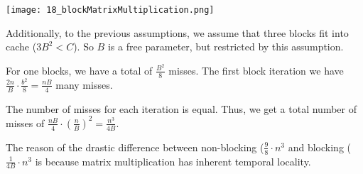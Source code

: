 \texttt{[image: 18\_blockMatrixMultiplication.png]}

Additionally, to the previous assumptions, we assume that three blocks fit into cache ($3B^2 < C$). So $B$ is a free parameter, but restricted by this assumption.

For one blocks, we have a total of $\frac{B^2}{8}$ misses. The first block iteration we have $\frac{2n}{B} \cdot \frac{b^2}{8} = \frac{nB}{4}$ many misses.

The number of misses for each iteration is equal. Thus, we get a total number of misses of $\frac{nB}{4} \cdot (\frac{n}{B})^2 = \frac{n^3}{4B}$.


The reason of the drastic difference between non-blocking ($\frac{9}{8} \cdot n^3$ and blocking ($\frac{1}{4B} \cdot n^3$ is because matrix multiplication has inherent temporal locality.
